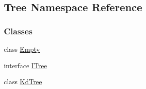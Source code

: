 \hypertarget{namespaceTree}{}\subsection{Tree Namespace Reference}
\label{namespaceTree}
\subsubsection*{Classes}
\begin{DoxyCompactItemize}
\item 
class \hyperlink{classTree_1_1Empty}{Empty}
\item 
interface \hyperlink{interfaceTree_1_1ITree}{I\+Tree}
\item 
class \hyperlink{classTree_1_1KdTree}{Kd\+Tree}
\end{DoxyCompactItemize}
